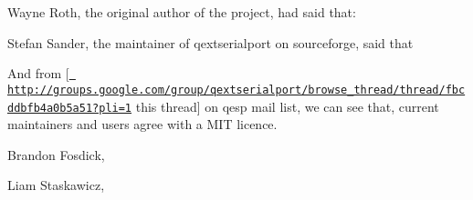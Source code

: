 \begin{DoxyItemize}
\item Wayne Roth, the original author of the project, had said that\+:
\end{DoxyItemize}


\begin{DoxyCode}{0}
\end{DoxyCode}



\begin{DoxyItemize}
\item Stefan Sander, the maintainer of qextserialport on sourceforge, said that
\end{DoxyItemize}


\begin{DoxyCode}{0}
\end{DoxyCode}


And from \mbox{[}\href{http://groups.google.com/group/qextserialport/browse_thread/thread/fbcddbfb4a0b5a51?pli=1}{\texttt{ http\+://groups.\+google.\+com/group/qextserialport/browse\+\_\+thread/thread/fbcddbfb4a0b5a51?pli=1}} this thread\mbox{]} on qesp mail list, we can see that, current maintainers and users agree with a M\+IT licence.


\begin{DoxyItemize}
\item Brandon Fosdick,
\end{DoxyItemize}


\begin{DoxyCode}{0}
\end{DoxyCode}



\begin{DoxyItemize}
\item Liam Staskawicz,
\end{DoxyItemize}


